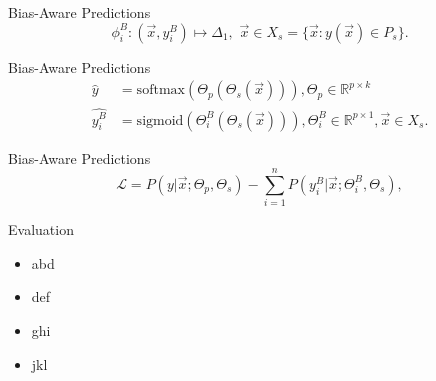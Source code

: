 \documentclass{beamer}
\begin{document}
%
\begin{frame}{Bias-Aware Predictions}
%
\begin{equation}
\phi^B_i: (\vec{x}, y^B_i) \mapsto \Delta_{1},\,\, \vec{x} \in X_s = \{\vec{x}: y(\vec{x}) \in P_s\}.  \label{eq:biastaskmap}
\end{equation}
\end{frame}
%
\begin{frame}{Bias-Aware Predictions}
%
\begin{equation}
\begin{split}
\hat{y} & = \mathrm{softmax}(\Theta_p(\Theta_s(\vec{x}))), \Theta_p \in \mathbb{R}^{p \times k} \\
\hat{y^B_i} & = \mathrm{sigmoid}(\Theta^B_i(\Theta_s(\vec{x}))), \Theta^B_{i} \in \mathbb{R}^{p \times 1}, \vec{x} \in X_s \label{eq:softmax}.
\end{split}
\end{equation}
\end{frame}
%
\begin{frame}{Bias-Aware Predictions}
%
\begin{equation}
\mathcal{L}=P(y|\vec{x};\Theta_p,\Theta_s) - \sum_{i=1}^{n} P(y^B_i|\vec{x};\Theta^B_{i},\Theta_s), \label{eq:jointloss}
\end{equation}
\end{frame}
%
\begin{frame}{Evaluation}
%
\begin{itemize}
\item
abd
\item
def
\item
ghi
\item
jkl
\end{itemize}
\end{frame}
%
\end{document}
